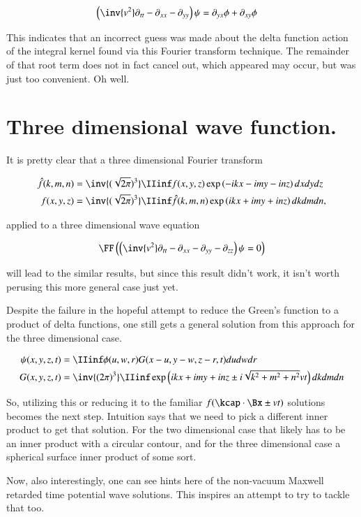 \begin{align*}
\left(\inv{v^2} \partial_{tt} -\partial_{xx} -\partial_{yy} \right)\psi 
&= \partial_{yx} \phi + \partial_{xy} \phi 
\end{align*}

This indicates that an incorrect guess was made about the delta function action of the integral kernel found 
via this Fourier transform technique.  The remainder of that root term does not in fact cancel out, which appeared may 
occur, but was just too convenient.  Oh well.

\section{Three dimensional wave function. }

It is pretty clear that a three dimensional Fourier transform

\begin{align*}
\hat{f}(k,m,n) &= \inv{(\sqrt{2\pi})^3} \IIinf f(x,y,z) \exp\left( -i k x - i m y - i n z \right) dx dy dz \\
{f}(x,y,z) &= \inv{(\sqrt{2\pi})^3} \IIinf \hat{f}(k,m,n) \exp\left( i k x + i m y + i n z \right) dk dm dn,
\end{align*}

applied to a three dimensional wave equation

\begin{align*}
\FF\left( \left(\inv{v^2} \partial_{tt} -\partial_{xx} -\partial_{yy} -\partial_{zz} \right)\psi = 0 \right)
\end{align*}

will lead to the similar results, but since this result didn't work, it isn't worth perusing this more general case just yet.

Despite the failure in the hopeful attempt to reduce the Green's function to a product of delta functions, one still gets a general solution
from this approach for the three dimensional case.

\begin{align}\label{eqn:wave_fourier:greensSolution3d}
{\psi}(x,y,z,t) &= \IIinf \phi(u,w,r) G( x-u, y-w, z-r, t) du dw dr \\
G(x,y,z,t) &= \inv{({2\pi})^3} \IIinf \exp\left( i k x + i m y + i n z \pm i \sqrt{k^2 + m^2 + n^2} v t \right) dk dm dn
\end{align}

So, utilizing this or reducing it to the familiar $f(\kcap \cdot \Bx \pm vt)$ solutions becomes the next step.  Intuition says that we
need to pick a different inner product to get that solution.  For the two dimensional case that likely has to be an inner product
with a circular contour, and for the three dimensional case a spherical surface inner product of some sort.

Now, also interestingly, one can see hints here of the non-vacuum Maxwell retarded time potential wave solutions.
This inspires an attempt to try to tackle that too.
